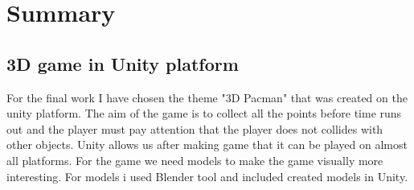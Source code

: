 \section*{Summary}
\subsection*{3D game in Unity platform}
For the final work I have chosen the theme "3D Pacman" that was created on the unity platform. The aim of the game is to collect all the points before time runs out and the player must pay attention that the player does not collides with other objects. Unity allows us after making game that it can be played on almost all platforms.
For the game we need models to make the game visually more interesting. For models i used Blender tool and included created models in Unity.
